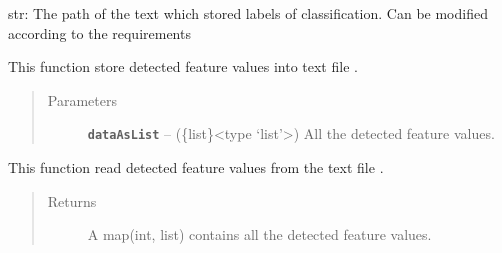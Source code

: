 \documentclass[letterpaper,10pt,english]{sphinxmanual}
\begin{document}

\begin{fulllineitems}
\label{Documentation of Code:dataSet.utilText.label_path}
str: The path of the text which stored labels of classification.
Can be modified according to the requirements

\end{fulllineitems}


\begin{fulllineitems}
\label{Documentation of Code:dataSet.utilText.SaveFeatures}
This function store detected feature values into text file .
\begin{quote}\begin{description}
\item[{Parameters}] \leavevmode
\textbf{\texttt{dataAsList}} -- (\{list\}\textless{}type `list'\textgreater{}) All the detected feature values.

\end{description}\end{quote}

\end{fulllineitems}


\begin{fulllineitems}
\label{Documentation of Code:dataSet.utilText.ReadFeatures}
This function read detected feature values from the text file .
\begin{quote}\begin{description}
\item[{Returns}] \leavevmode
A map(int, list) contains all the detected feature values.

\end{description}\end{quote}

\end{fulllineitems}

\end{document}
